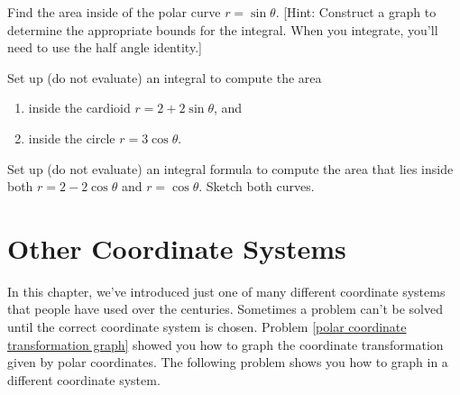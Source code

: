 \begin{problem} 
Find the area inside of the polar curve $r=\sin\theta$. [Hint: Construct a graph to determine the appropriate bounds for the integral. When you integrate, you'll need to use the half angle identity.] 
\end{problem}


\begin{problem}
Set up (do not evaluate) an integral to compute the area 
\begin{enumerate}
\item inside the cardioid $r=2+2\sin\theta$, and 
\item inside the circle $r=3\cos\theta$.
\end{enumerate}
\end{problem}

\begin{problem}
Set up (do not evaluate) an integral formula to compute the area that lies inside both $r=2-2\cos\theta$ and $r=\cos\theta$. Sketch both curves. 
\end{problem}


\section{Other Coordinate Systems}
In this chapter, we've introduced just one of many different coordinate systems that people have used over the centuries. Sometimes a problem can't be solved until the correct coordinate system is chosen. Problem \ref{polar coordinate transformation graph} showed you how to graph the coordinate transformation given by polar coordinates.  The following problem shows you how to graph in a different coordinate system.

